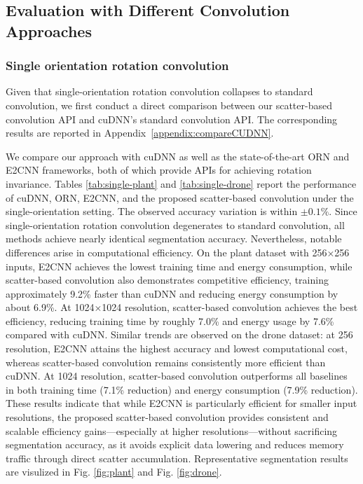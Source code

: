 \subsection{Evaluation with Different Convolution Approaches}\label{subsubsec:differentConvs}

\subsubsection{Single orientation rotation convolution}\label{subsubsec:singleOri}
Given that single-orientation rotation convolution collapses to standard convolution, we first conduct a direct comparison between our scatter-based convolution API and cuDNN’s standard convolution API. The corresponding results are reported in Appendix~\ref{appendix:compareCUDNN}.

We compare our approach with cuDNN as well as the state-of-the-art ORN \cite{orn} and E2CNN \cite{e2cnn} frameworks, both of which provide APIs for achieving rotation invariance.
Tables \ref{tab:single-plant} and \ref{tab:single-drone} report the performance of cuDNN, ORN, E2CNN, and the proposed scatter-based convolution under the single-orientation setting.
The observed accuracy variation is within $\pm 0.1\%$.
Since single-orientation rotation convolution degenerates to standard convolution, all methods achieve nearly identical segmentation accuracy. Nevertheless, notable differences arise in computational efficiency.
On the plant dataset with 256×256 inputs, E2CNN achieves the lowest training time and energy consumption, while scatter-based convolution also demonstrates competitive efficiency, training approximately 9.2\% faster than cuDNN and reducing energy consumption by about 6.9\%. At 1024×1024 resolution, scatter-based convolution achieves the best efficiency, reducing training time by roughly 7.0\% and energy usage by 7.6\% compared with cuDNN.
Similar trends are observed on the drone dataset: at 256 resolution, E2CNN attains the highest accuracy and lowest computational cost, whereas scatter-based convolution remains consistently more efficient than cuDNN. At 1024 resolution, scatter-based convolution outperforms all baselines in both training time (7.1\% reduction) and energy consumption (7.9\% reduction).
These results indicate that while E2CNN is particularly efficient for smaller input resolutions, the proposed scatter-based convolution provides consistent and scalable efficiency gains—especially at higher resolutions—without sacrificing segmentation accuracy, as it avoids explicit data lowering and reduces memory traffic through direct scatter accumulation.
Representative segmentation results are visulized in Fig. \ref{fig:plant} and Fig. \ref{fig:drone}.

